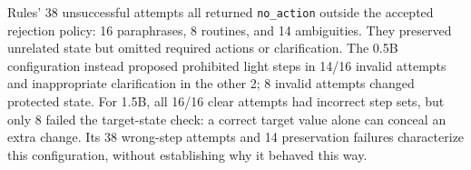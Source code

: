 Rules' 38 unsuccessful attempts all returned \texttt{no\_action} outside the accepted rejection policy: 16 paraphrases, 8 routines, and 14 ambiguities. They preserved unrelated state but omitted required actions or clarification. The 0.5B configuration instead proposed prohibited light steps in 14/16 invalid attempts and inappropriate clarification in the other 2; 8 invalid attempts changed protected state. For 1.5B, all 16/16 clear attempts had incorrect step sets, but only 8 failed the target-state check: a correct target value alone can conceal an extra change. Its 38 wrong-step attempts and 14 preservation failures characterize this configuration, without establishing why it behaved this way.
